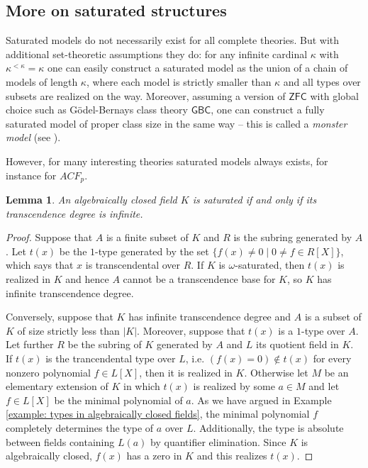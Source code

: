 \documentclass[10pt]{amsart}
\newtheorem{lemma}[theorem]{Lemma}
\theoremstyle{definition}
\theoremstyle{remark}
\begin{document}




\subsection{More on saturated structures} 

Saturated models do not necessarily exist for all complete theories. But with additional set-theoretic assumptions they do: for any infinite cardinal $\kappa$ with $\kappa^{<\kappa}=\kappa$ one can easily construct a saturated model as the union of a chain of models of length $\kappa$, where each model is strictly smaller than $\kappa$ and all types over subsets are realized on the way. Moreover, assuming a version of $\mathsf{ZFC}$ with global choice such as G\"odel-Bernays class theory $\mathsf{GBC}$, one can construct a fully saturated model of proper class size in the same way -- this is called a \emph{monster model} (see \cite[Theorem 6.1.7]{MR2908005}). 

However, for many interesting theories saturated models always exists, for instance for $ACF_p$. 

\begin{lemma} 
An algebraically closed field $K$ is saturated if and only if its transcendence degree is infinite. 
\end{lemma} 
\begin{proof} 
Suppose that $A$ is a finite subset of $K$ and $R$ is the subring generated by $A$. Let $t(x)$ be the $1$-type generated by the set $\{f(x)\neq0\mid 0\neq f\in R[X]\}$, which says that $x$ is transcendental over $R$. If $K$ is $\omega$-saturated, then $t(x)$ is realized in $K$ and hence $A$ cannot be a transcendence base for $K$, so $K$ has infinite transcendence degree. 

Conversely, suppose that $K$ has infinite transcendence degree and $A$ is a subset of $K$ of size strictly less than $|K|$. Moreover, suppose that $t(x)$ is a $1$-type over $A$. Let further $R$ be the subring of $K$ generated by $A$ and $L$ its quotient field in $K$. If $t(x)$ is the trancendental type over $L$, i.e. $(f(x)=0)\notin t(x)$ for every nonzero polynomial $f\in L[X]$, then it is realized in $K$. Otherwise let $M$ be an elementary extension of $K$ in which $t(x)$ is realized by some $a\in M$ and let $f\in L[X]$ be the minimal polynomial of $a$. As we have argued in Example \ref{example: types in algebraically closed fields}, the minimal polynomial $f$ completely determines the type of $a$ over $L$. Additionally, the type is absolute between fields containing $L(a)$ by quantifier elimination. Since $K$ is algebraically closed, $f(x)$ has a zero in $K$ and this realizes $t(x)$. 
\end{proof} 
\end{document}

